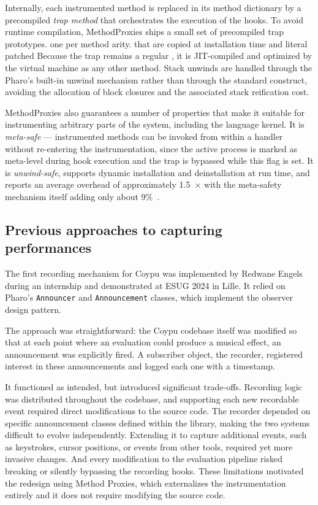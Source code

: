 \documentclass[
]{ceurart}
\begin{document}
Internally, each instrumented method is replaced in its method dictionary by a precompiled \emph{trap method} that orchestrates the execution of the hooks.
To avoid runtime compilation, MethodProxies ships a small set of precompiled trap prototypes. one per method arity. that are copied at installation time and literal patched 
Because the trap remains a regular , it is JIT-compiled and optimized by the virtual machine as any other method.
Stack unwinds are handled through the Pharo's built-in unwind mechanism rather than through the standard  construct, avoiding the allocation of block closures and the associated stack reification cost.

MethodProxies also guarantees a number of properties that make it suitable for instrumenting arbitrary parts of the system, including the language kernel. It is \emph{meta-safe} --- instrumented methods can be invoked from within a handler without re-entering the instrumentation, since the active process is marked as meta-level during hook execution and the trap is bypassed while this flag is set.
It is \emph{unwind-safe}, supports dynamic installation and deinstallation at run time, and reports an average overhead of approximately 1.5~$\times$ with the meta-safety mechanism itself adding only about 9\%~\cite{Jord24b}.

\subsection{Previous approaches to capturing performances}
The first recording mechanism for Coypu was implemented by Redwane Engels during an internship and demonstrated at ESUG 2024 in Lille.
It relied on Pharo's \texttt{Announcer} and \texttt{Announcement} classes, which implement the observer design pattern.

The approach was straightforward: the Coypu codebase itself was modified so that at each point where an evaluation could produce a musical effect, an announcement was explicitly fired.
A subscriber object, the recorder, registered interest in these announcements and logged each one with a timestamp.

It functioned as intended, but introduced significant trade-offs.
Recording logic was distributed throughout the codebase, and supporting each new recordable event required direct modifications to the source code.
The recorder depended on specific announcement classes defined within the library, making the two systems difficult to evolve independently.
Extending it to capture additional events, such as keystrokes, cursor positions, or events from other tools, required yet more invasive changes.
And every modification to the evaluation pipeline risked breaking or silently bypassing the recording hooks.
These limitations motivated the redesign using Method Proxies, which externalizes the instrumentation entirely and it does not require modifying the source code.
\end{document}
